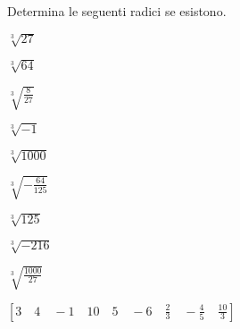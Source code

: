 
\begin{esercizio}[\Ast]
 \label{ese:2.06}
Determina le seguenti radici se esistono.
 \begin{multicols}{3}
 \begin{enumeratea}
 \item $\sqrt[3]{27}$
 \item $\sqrt[3]{64}$
 \item $\sqrt[3]{\frac 8{27}}$
 \item $\sqrt[3]{-1}$
 \item $\sqrt[3]{1000}$
 \item $\sqrt[3]{-\frac{64}{125}}$
 \item $\sqrt[3]{125}$
 \item $\sqrt[3]{-216}$
 \item $\sqrt[3]{\frac{1000}{27}}$
 \end{enumeratea}
 \end{multicols}
\begin{flushright}
\vspace*{-8pt}
$[3 \quad 4 \quad -1 \quad 10 \quad 5 \quad -6 \quad \frac{2}{3} \quad
  -\frac{4}{5} \quad \frac{10}{3}]$
\end{flushright}
\end{esercizio}


